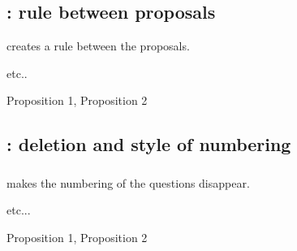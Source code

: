 \vspace{1cm} 

\subsection{ : rule between proposals}

 creates a rule between the proposals.

\begin{minipage}[c][][t]{.45\linewidth}
\begin{tkzexample}
  \begin{alterqcm}[lq=3cm,sep=true]
    etc..
\end{alterqcm}\end{tkzexample}
\end{minipage}\hfill
\begin{minipage}[c][][t]{.45\linewidth}
  \begin{alterqcm}[lq=3cm,sep=true]
  {{Proposition 1},
   {Proposition 2}}
  \end{alterqcm}
\end{minipage}

\subsection{ : deletion and style of numbering }
\subsubsection{}
 makes the numbering of the questions disappear.

\begin{minipage}[c][][t]{.45\linewidth}
\begin{tkzexample}
  \begin{alterqcm}[lq=3cm,num=false]
     etc...
  \end{alterqcm}
\end{tkzexample}
\end{minipage}\hfill
\begin{minipage}[c][][t]{.45\linewidth}
  \begin{alterqcm}[lq=3cm,num=false]
  {%
  {Proposition 1},
  {Proposition 2}}
  \end{alterqcm}
\end{minipage}   

